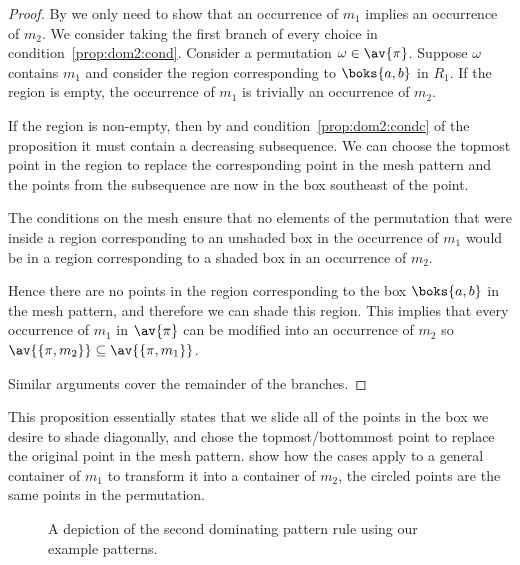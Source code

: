 \begin{proof}
    By  we only need to show that an occurrence of
    \(m_1\) implies an occurrence of \(m_2\). We consider taking the first
    branch of every choice in condition~\eqref{prop:dom2:cond}. Consider a
    permutation \(\omega \in \av{\pi}\). Suppose \(\omega\) contains \(m_1\) and
    consider the region corresponding to \(\boks{a,b}\) in \(R_1\). If the
    region is empty, the occurrence of \(m_1\) is trivially an occurrence of
    \(m_2\).

    If the region is non-empty, then by  and
    condition~\eqref{prop:dom2:condc} of the proposition it must contain a
    decreasing subsequence. We can choose the topmost point in the region to
    replace the corresponding point in the mesh pattern and the points from the
    subsequence are now in the box southeast of the point.

    The conditions on the mesh ensure that no elements of the permutation that
    were inside a region corresponding to an unshaded box in the occurrence of
    \(m_1\) would be in a region corresponding to a shaded box in an occurrence
    of \(m_2\).

    Hence there are no points in the region corresponding to the box
    \(\boks{a,b}\) in the mesh pattern, and therefore we can shade this region.
    This implies that every occurrence of \(m_1\) in \(\av{\pi}\) can be
    modified into an occurrence of \(m_2\) so \(\av{\{\pi,m_2\}} \subseteq
    \av{\{\pi,m_1\}}\).

    Similar arguments cover the remainder of the branches.
\end{proof}

This proposition essentially states that we slide all of the points in the box
we desire to shade diagonally, and chose the topmost/bottommost point to replace
the original point in the mesh pattern.  show how the cases
apply to a general container of \(m_1\) to transform it into a container of
\(m_2\), the circled points are the same points in the permutation.
\begin{figure}
\raisebox{8ex}{\(\coinc{}\)}
\caption{A depiction of the second dominating pattern rule using our example patterns.}
\label{fig:d2}
\end{figure}

